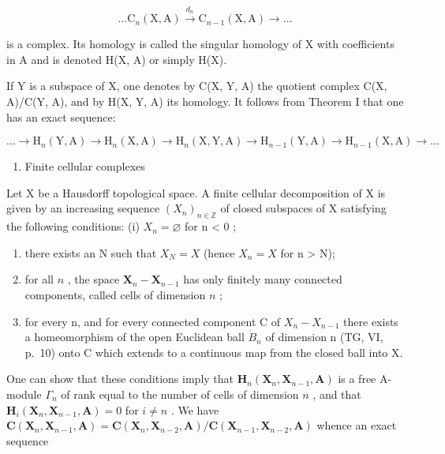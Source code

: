 \[
\dots \mathrm{C} _ {n} (\mathrm{X}, \mathrm{A}) \xrightarrow {d _ {n}} \mathrm{C} _ {n - 1} (\mathrm{X}, \mathrm{A}) \rightarrow \dots
\]

is a complex. Its homology is called the singular homology of X with coefficients in A and is denoted H(X, A) or simply H(X).

If Y is a subspace of X, one denotes by C(X, Y, A) the quotient complex C(X, A)/C(Y, A), and by H(X, Y, A) its homology. It follows from Theorem I that one has an exact sequence:

\[
\dots \rightarrow \mathrm{H} _ {n} (\mathrm{Y}, \mathrm{A}) \rightarrow \mathrm{H} _ {n} (\mathrm{X}, \mathrm{A}) \rightarrow \mathrm{H} _ {n} (\mathrm{X}, \mathrm{Y}, \mathrm{A}) \rightarrow \mathrm{H} _ {n - 1} (\mathrm{Y}, \mathrm{A}) \rightarrow \mathrm{H} _ {n - 1} (\mathrm{X}, \mathrm{A}) \rightarrow \dots
\]

\begin{enumerate}
\def\labelenumi{\arabic{enumi})}
\setcounter{enumi}{1}
\tightlist
\item
  Finite cellular complexes
\end{enumerate}

Let X be a Hausdorff topological space. A finite cellular decomposition of X is given by an increasing sequence \((X_{n})_{n\in\mathbb{Z}}\) of closed subspaces of X satisfying the following conditions: (i) \(X_{n} = \varnothing\) for n \textless{} 0 ;

\begin{enumerate}
\def\labelenumi{(\roman{enumi})}
\setcounter{enumi}{1}
\item
  there exists an N such that \(X_{N} = X\) (hence \(X_{n} = X\) for n \textgreater{} N);
\item
  for all \(n\) , the space \(\mathbf{X}_{n} - \mathbf{X}_{n-1}\) has only finitely many connected components, called cells of dimension \(n\) ;
\item
  for every n, and for every connected component C of \(X_{n} - X_{n-1}\) there exists a homeomorphism of the open Euclidean ball \(\dot{B}_{n}\) of dimension n (TG, VI, p.~10) onto C which extends to a continuous map from the closed ball into X.
\end{enumerate}

One can show that these conditions imply that \(\mathbf{H}_n(\mathbf{X}_n, \mathbf{X}_{n-1}, \mathbf{A})\) is a free A-module \(\Gamma_n\) of rank equal to the number of cells of dimension \(n\) , and that \(\mathbf{H}_i(\mathbf{X}_n, \mathbf{X}_{n-1}, \mathbf{A}) = 0\) for \(i \neq n\) . We have \(\mathbf{C}(\mathbf{X}_n, \mathbf{X}_{n-1}, \mathbf{A}) = \mathbf{C}(\mathbf{X}_n, \mathbf{X}_{n-2}, \mathbf{A}) / \mathbf{C}(\mathbf{X}_{n-1}, \mathbf{X}_{n-2}, \mathbf{A})\) whence an exact sequence

